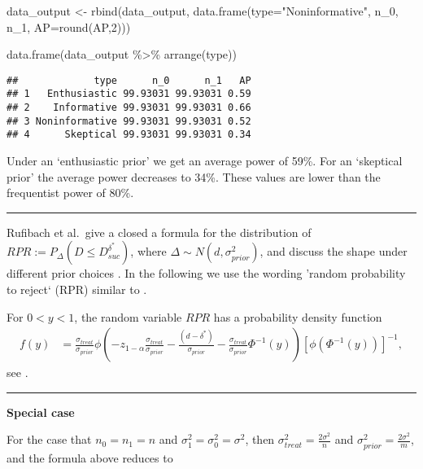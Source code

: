 \documentclass[
]{book}
\newenvironment{Shaded}{\begin{snugshade}}{\end{snugshade}}
\newcommand{\AttributeTok}[1]{\textcolor[rgb]{0.77,0.63,0.00}{#1}}
\newcommand{\DecValTok}[1]{\textcolor[rgb]{0.00,0.00,0.81}{#1}}
\newcommand{\FunctionTok}[1]{\textcolor[rgb]{0.00,0.00,0.00}{#1}}
\newcommand{\NormalTok}[1]{#1}
\newcommand{\OtherTok}[1]{\textcolor[rgb]{0.56,0.35,0.01}{#1}}
\newcommand{\SpecialCharTok}[1]{\textcolor[rgb]{0.00,0.00,0.00}{#1}}
\newcommand{\StringTok}[1]{\textcolor[rgb]{0.31,0.60,0.02}{#1}}
\begin{document}
\begin{Shaded}
\begin{Highlighting}[]
\NormalTok{data\_output }\OtherTok{\textless{}{-}} \FunctionTok{rbind}\NormalTok{(data\_output, }\FunctionTok{data.frame}\NormalTok{(}\AttributeTok{type=}\StringTok{"Noninformative"}\NormalTok{, n\_0, n\_1, }\AttributeTok{AP=}\FunctionTok{round}\NormalTok{(AP,}\DecValTok{2}\NormalTok{)))}

\FunctionTok{data.frame}\NormalTok{(data\_output }\SpecialCharTok{\%\textgreater{}\%} \FunctionTok{arrange}\NormalTok{(type))}
\end{Highlighting}
\end{Shaded}

\begin{verbatim}
##             type      n_0      n_1   AP
## 1   Enthusiastic 99.93031 99.93031 0.59
## 2    Informative 99.93031 99.93031 0.66
## 3 Noninformative 99.93031 99.93031 0.52
## 4      Skeptical 99.93031 99.93031 0.34
\end{verbatim}

Under an `enthusiastic prior' we get an average power of 59\%. For an `skeptical prior' the average power decreases to 34\%. These values are lower than the frequentist power of 80\%.

\begin{center}\rule{0.5\linewidth}{0.5pt}\end{center}

Rufibach et al.~give a closed a formula for the distribution of \(RPR:=P_\Delta(D\leq D_{suc}^{\delta^*})\), where \(\Delta \sim N(d,\sigma^2_{prior})\), and discuss the shape under different prior choices \citet{Rufibach2016}. In the following we use the wording 'random probability to reject` (RPR) similar to \citet{Kunzmann2022}.

For \(0<y<1\), the random variable \(RPR\) has a probability density function
\[
\begin{aligned}
f(y)&=\frac{\sigma_{treat}}{\sigma_{prior}} \phi\left(-z_{1-\alpha}\frac{\sigma_{treat}}{\sigma_{prior}}-\frac{(d-\delta^*)}{\sigma_{prior}}-\frac{\sigma_{treat}}{\sigma_{prior}}\Phi^{-1}(y) \right)\left[ \phi\left(\Phi^{-1}(y) \right) \right]^{-1},
\end{aligned}
\]
see \citet{Rufibach2016}.

\begin{center}\rule{0.5\linewidth}{0.5pt}\end{center}

\textbf{Special case}

For the case that \(n_0=n_1=n\) and \(\sigma_1^2=\sigma_0^2=\sigma^2\), then \(\sigma_{treat}^2=\frac{2\sigma^2}{n}\) and \(\sigma_{prior}^2=\frac{2\sigma^2}{m}\), and the formula above reduces to
\end{document}
